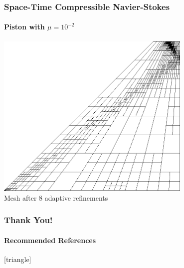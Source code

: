 \documentclass[18pt,xcolor=table]{beamer}
\begin{document}
\begin{frame}[t]
\frametitle{Space-Time Compressible Navier-Stokes}
\framesubtitle{Piston with $\mu=10^{-2}$}  %

\centering
\includegraphics[width=0.7\textwidth]{Piston/Piston_mesh.png}
\\Mesh after 8 adaptive refinements
\end{frame}



\begin{frame}[shrink=10]
\frametitle{Thank You!}
\framesubtitle{Recommended References}
    \nocite{DPGOverview}
    \nocite{EllisLC}
    \nocite{CamelliaDPG}
    \nocite{DemkowiczHeuer}
    \nocite{ChanHeuerThanhDemkowicz2012}
    \nocite{DPGStokes}
    \renewcommand*{\bibfont}{\small}
    [triangle]
    \printbibliography[keyword=main]
    \printbibliography[notkeyword=main]
\end{frame}

\appendix
\end{document}
